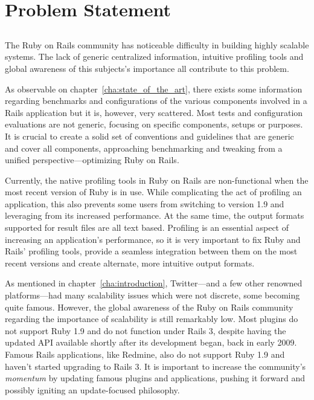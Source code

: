 \chapter{Problem Statement} %
\label{cha:problem_statement}

\section*{} %
The Ruby on Rails community has noticeable difficulty in building highly scalable systems. The lack of generic centralized information, intuitive profiling tools and global awareness of this subjects's importance all contribute to this problem.

As observable on chapter~\ref{cha:state_of_the_art}, there exists some information regarding benchmarks and configurations of the various components involved in a Rails application but it is, however, very scattered. Most tests and configuration evaluations are not generic, focusing on specific components, setups or purposes. It is crucial to create a solid set of conventions and guidelines that are generic and cover all components, approaching benchmarking and tweaking from a unified perspective---optimizing Ruby on Rails.

Currently, the native profiling tools in Ruby on Rails are non-functional when the most recent version of Ruby is in use. While complicating the act of profiling an application, this also prevents some users from switching to version 1.9 and leveraging from its increased performance. At the same time, the output formats supported for result files are all text based. Profiling is an essential aspect of increasing an application's performance, so it is very important to fix Ruby and Rails' profiling tools, provide a seamless integration between them on the most recent versions and create alternate, more intuitive output formats.

As mentioned in chapter~\ref{cha:introduction}, Twitter---and a few other renowned platforms---had many scalability issues which were not discrete, some becoming quite famous. However, the global awareness of the Ruby on Rails community regarding the importance of scalability is still remarkably low. Most plugins do not support Ruby 1.9 and do not function under Rails 3, despite having the updated API available shortly after its development began, back in early 2009. Famous Rails applications, like Redmine, also do not support Ruby 1.9 and haven't started upgrading to Rails 3. It is important to increase the community's \textit{momentum} by updating famous plugins and applications, pushing it forward and possibly igniting an update-focused philosophy.

